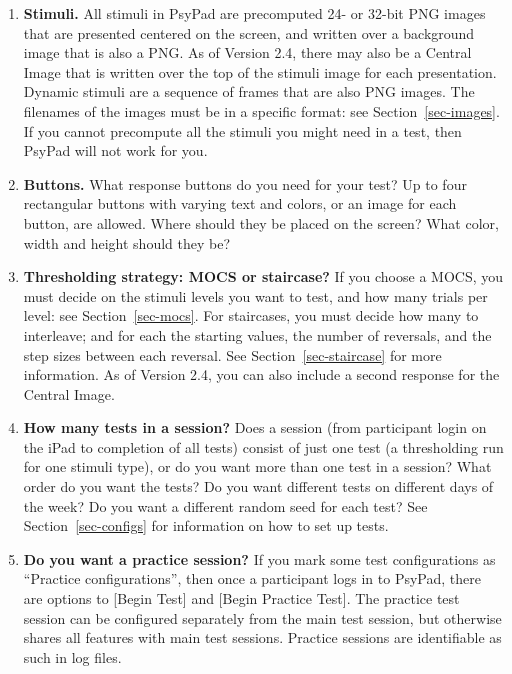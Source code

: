 \documentclass{article}
\begin{document}
\begin{enumerate}

\item {\bf Stimuli.} All stimuli in PsyPad are precomputed 
24- or 32-bit PNG
images that are presented centered on the screen, and written over a background image that is also a PNG.
As of Version 2.4, there may also be a Central Image that is written over the top
of the stimuli image for each presentation.
Dynamic stimuli are a sequence of frames that are also
PNG images.  The filenames of the images must be in
a specific format: see Section~\ref{sec-images}.
If you cannot precompute all the stimuli you might need in a test, then
PsyPad will not work for you.

\item {\bf Buttons.} What response buttons do you need for your test?  
Up to four rectangular buttons with varying text and colors, 
or an image for each button, are allowed. Where
should they be placed on the screen? 
What color, width and height should they be?

\item {\bf Thresholding strategy: MOCS or staircase?}
If you choose a MOCS, you must decide on the stimuli levels you want to
test, and how many trials per level: see Section~\ref{sec-mocs}.
For staircases, you must decide how many to interleave; and for each the starting
values, the number of reversals, and the step sizes between each reversal.
See Section~\ref{sec-staircase} for more information.
As of Version 2.4, you can also include a second response for the Central Image.

\item {\bf How many tests in a session?}
Does a session (from participant login on the iPad
to completion of all tests) consist of just one
test (a thresholding run for one stimuli type), or do you want more than one test
in a session?  What order do you
want the tests? Do you want different tests on different days of the week?
Do you want a different random seed for each test?
See Section~\ref{sec-configs} for information on how to set up tests.

\item {\bf Do you want a practice session?}
If you mark some test configurations as ``Practice configurations'', then 
once a participant logs in to PsyPad, there are options 
to [Begin Test] and [Begin Practice Test].
The practice test session can be configured separately 
from the main test session, but otherwise shares all features with 
main test sessions. Practice sessions are identifiable as such in log
files.

\end{enumerate}
\end{document}
